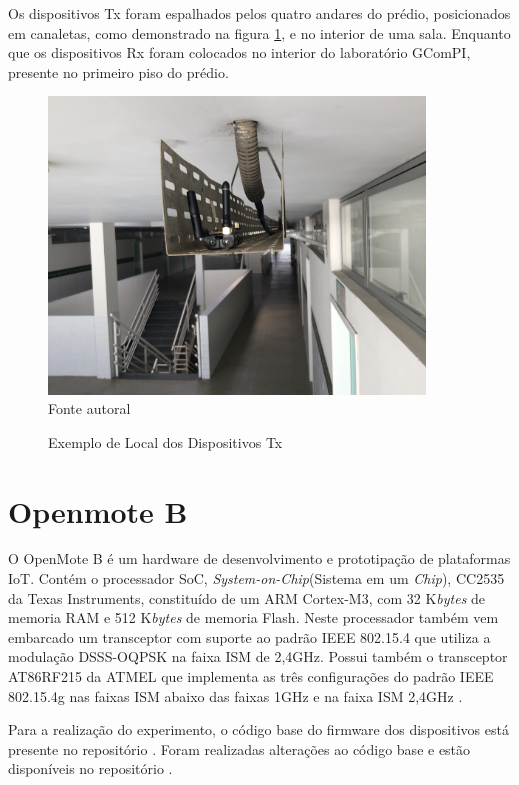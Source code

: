 Os dispositivos Tx foram espalhados pelos quatro andares do prédio, posicionados em canaletas, como demonstrado na figura \ref{fig:tx_canaleta}, e no interior de uma sala. Enquanto que os dispositivos Rx foram colocados no interior do laboratório GComPI, presente no primeiro piso do prédio.

\begin{figure}[h]
    \begin{center}
        \caption{Exemplo de Local dos Dispositivos Tx}
        \includegraphics[width=10cm]{./sections/textual/chapters/images/tx_canaleta.jpg}\\
        Fonte autoral
        \label{fig:tx_canaleta}
    \end{center}
\end{figure}

\section{Openmote B}
O OpenMote B é um hardware de desenvolvimento e prototipação de plataformas IoT. Contém o processador SoC, \emph{System-on-Chip}(Sistema em um \emph{Chip}), CC2535 da Texas Instruments, constituído de um ARM Cortex-M3, com 32 K\emph{bytes} de memoria RAM e 512 K\emph{bytes} de memoria Flash. Neste processador também vem embarcado um transceptor com suporte ao padrão IEEE 802.15.4 que utiliza a modulação DSSS-OQPSK na faixa ISM de 2,4GHz. Possui também o transceptor AT86RF215 da ATMEL que implementa as três configurações do padrão IEEE 802.15.4g nas faixas ISM abaixo das faixas 1GHz e na faixa ISM 2,4GHz \cite{openmoteb-userguide}.

Para a realização do experimento, o código base do firmware dos dispositivos está presente no repositório \cite{openmoteb-firmware}. Foram realizadas alterações ao código base e estão disponíveis no repositório \cite{openmoteb-gcompi}.

